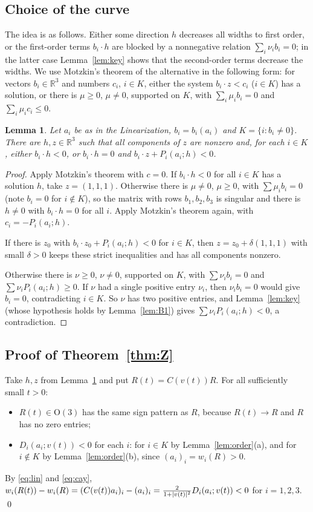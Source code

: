\documentclass[11pt]{article}
\newtheorem{lemma}[theorem]{Lemma}
\theoremstyle{definition}
\theoremstyle{remark}
\newcommand{\R}{\mathbb{R}}
\newcommand{\Ort}{\mathrm{O}(3)}
\DeclarePairedDelimiter{\abs}{\lvert}{\rvert}
\begin{document}
\subsection{Choice of the curve}
The idea is as follows. Either some direction $h$ decreases all widths to first order, or the
first-order terms $b_i\cdot h$ are blocked by a nonnegative relation $\sum_i\nu_ib_i=0$; in the latter
case Lemma~\ref{lem:key} shows that the second-order terms decrease the widths.
We use Motzkin's theorem of the alternative \cite[Satz~D6]{Motzkin1936} in the following form:
for vectors $b_i\in\R^3$ and numbers $c_i$, $i\in K$, either the system $b_i\cdot z<c_i$ ($i\in K$)
has a solution, or there is $\mu\ge0$, $\mu\ne0$, supported on $K$, with $\sum_i\mu_ib_i=0$ and
$\sum_i\mu_ic_i\le0$.

\begin{lemma}\label{lem:choice}
Let $a_i$ be as in the Linearization, $b_i=b_i(a_i)$ and $K=\{i:b_i\ne0\}$. There are $h,z\in\R^3$
such that all components of $z$ are nonzero and, for each $i\in K$, either $b_i\cdot h<0$, or
$b_i\cdot h=0$ and $b_i\cdot z+P_i(a_i;h)<0$.
\end{lemma}

\begin{proof}
Apply Motzkin's theorem with $c=0$. If $b_i\cdot h<0$ for all $i\in K$ has a solution $h$, take
$z=(1,1,1)$. Otherwise there is $\mu\ne0$, $\mu\ge0$, with $\sum\mu_ib_i=0$ (note $b_i=0$ for
$i\notin K$), so the matrix with rows $b_1,b_2,b_3$ is singular and there is $h\ne0$ with $b_i\cdot h=0$
for all $i$. Apply Motzkin's theorem again, with $c_i=-P_i(a_i;h)$.

If there is $z_0$ with $b_i\cdot z_0+P_i(a_i;h)<0$ for $i\in K$, then $z=z_0+\delta(1,1,1)$ with small
$\delta>0$ keeps these strict inequalities and has all components nonzero.

Otherwise there is $\nu\ge0$, $\nu\ne0$, supported on $K$, with $\sum\nu_ib_i=0$ and
$\sum\nu_iP_i(a_i;h)\ge0$. If $\nu$ had a single positive entry $\nu_i$, then $\nu_ib_i=0$ would give
$b_i=0$, contradicting $i\in K$. So $\nu$ has two positive entries, and Lemma~\ref{lem:key} (whose
hypothesis holds by Lemma~\ref{lem:B1}) gives $\sum\nu_iP_i(a_i;h)<0$, a contradiction.
\end{proof}

\subsection{Proof of Theorem~\ref{thm:Z}}
Take $h,z$ from Lemma~\ref{lem:choice} and put $R(t)=C(v(t))R$. For all sufficiently small $t>0$:
\begin{itemize}
\item $R(t)\in\Ort$ has the same sign pattern as $R$, because $R(t)\to R$ and $R$ has no zero entries;
\item $D_i(a_i;v(t))<0$ for each $i$: for $i\in K$ by Lemma~\ref{lem:order}(a), and for $i\notin K$ by
Lemma~\ref{lem:order}(b), since $(a_i)_i=w_i(R)>0$.
\end{itemize}
By \eqref{eq:lin} and \eqref{eq:cay},
$w_i(R(t))-w_i(R)=(C(v(t))a_i)_i-(a_i)_i=\frac{2}{1+\abs{v(t)}^2}D_i(a_i;v(t))<0$ for $i=1,2,3$.
\qed
\end{document}
